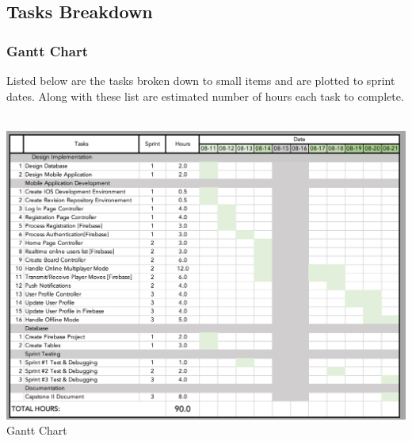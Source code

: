 \documentclass{scrartcl}
\begin{document}
    \subsection{Tasks Breakdown}
        \subsubsection{Gantt Chart}
        Listed below are the tasks broken down to small items and are plotted to sprint dates.  Along with these list are estimated number of hours each task to complete. ~\\
        \begin{center}
            \includegraphics[width=6in]{images/Gantt Chart.png}\\
        \caption{Gantt Chart}
        \end{center}
        ~\\
\end{document}
